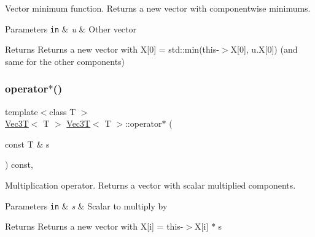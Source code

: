 Vector minimum function. Returns a new vector with componentwise minimums. 


\begin{DoxyParams}[1]{Parameters}
\mbox{\tt in}  & {\em u} & Other vector \\
\hline
\end{DoxyParams}
\begin{DoxyReturn}{Returns}
Returns a new vector with X\mbox{[}0\mbox{]} = std\+::min(this-\/$>$X\mbox{[}0\mbox{]}, u.\+X\mbox{[}0\mbox{]}) (and same for the other components) 
\end{DoxyReturn}
\mbox{\label{classVec3T_aa4768276707889db34a716e9e476b9f1}} 
\subsubsection{\texorpdfstring{operator$\ast$()}{operator*()}\hspace{0.1cm}{\footnotesize\ttfamily [1/2]}}
{\footnotesize\ttfamily template$<$class T $>$ \\
\hyperlink{classVec3T}{Vec3T}$<$ T $>$ \hyperlink{classVec3T}{Vec3T}$<$ T $>$\+::operator$\ast$ (\begin{DoxyParamCaption}\item[{const T \&}]{s }\end{DoxyParamCaption}) const\hspace{0.3cm}{\ttfamily [inline]}, {\ttfamily [noexcept]}}



Multiplication operator. Returns a vector with scalar multiplied components. 


\begin{DoxyParams}[1]{Parameters}
\mbox{\tt in}  & {\em s} & Scalar to multiply by \\
\hline
\end{DoxyParams}
\begin{DoxyReturn}{Returns}
Returns a new vector with X\mbox{[}i\mbox{]} = this-\/$>$X\mbox{[}i\mbox{]} $\ast$ s 
\end{DoxyReturn}
\mbox{\label{classVec3T_a579db6fb2bed30b3f024d1a017d7a124}} 
